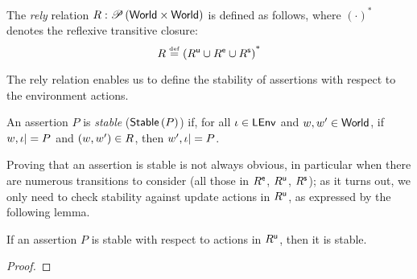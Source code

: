 \begin{definition}[Rely]
The \emph{rely} relation $R: \mathscr{P}\left(\textsf{World} \times \textsf{World} \right)$ is defined as follows, where $(\cdot)^{\text{*}}$ denotes the reflexive transitive closure:
%
\[
  R \mathrel{\stackrel{\smash{\scriptscriptstyle{\mathrm{def}}}}{=}}  \left(R^{\textsf{u}} \cup R^{\textsf{e}} \cup R^{\textsf{s}} \right)^{\text{*}}
\]
%
\end{definition}

The rely relation enables us to define the stability of assertions with respect to the environment actions.
%
\begin{definition}[Stability]
An assertion $P$ is \emph{stable} ($\textsf{Stable}\left(P\right)$) if, for all $\iota \in \textsf{LEnv}$ and $w, w' \in \textsf{World}$, if $w, \iota |= P$ and $(w, w') \in R$, then $w', \iota |= P$.
\end{definition}
%
Proving that an assertion is stable is not always obvious, in particular when there are numerous transitions to consider (all those in $R^{\textsf{e}}$, $R^{\textsf{u}}$, $R^{\textsf{s}}$); as it turns out, we only need to check stability against update actions in $R^{\textsf{u}}$, as expressed by the following lemma.
%
\begin{lemma}[Stability]
If an assertion $P$ is stable with respect to actions in $R^{\textsf{u}}$, then it is stable.
\begin{proof}
\todo
\end{proof}
	 
\end{lemma}
%
